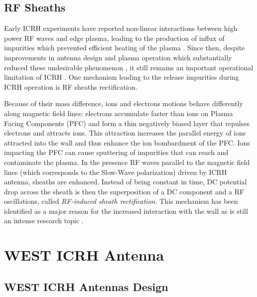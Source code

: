 \subsection{RF Sheaths}\label{sec:RF_sheaths}
Early ICRH experiments have reported non-linear interactions between high power RF waves and edge plasma, leading to the production of influx of impurities which prevented efficient heating of the plasma . Since then, despite improvements in antenna design and plasma operation which substantially reduced these undesirable phenomenon , it still remains an important operational limitation of ICRH . One mechanism leading to the release impurities during ICRH operation is RF sheaths rectification. 

Because of their mass difference, ions and electrons motions behave differently along magnetic field lines: electrons accumulate faster than ions on Plasma Facing Components (PFC) and form a thin negatively biased layer that repulses electrons and attracts ions. This attraction increases the  parallel energy of ions attracted into the wall and thus enhance the ion bombardment of the PFC. Ions impacting the PFC can cause sputtering of impurities that can reach and contaminate the plasma. In the presence RF waves parallel to the magnetic field lines (which corresponds to the Slow-Wave polarization) driven by ICRH antenna, sheaths are enhanced. Instead of being constant in time, DC potential drop across the sheath is then the superposition of a DC component and a RF oscillations, called \textit{RF-induced sheath rectification}. This  mechanism has been identified as a major reason for the increased interaction with the wall as is still an intense research topic .



\section{WEST ICRH Antenna}\label{eq:WEST_ICRF_work}


\subsection{WEST ICRH Antennas Design}\label{eq:WEST_ICRH_antenna}

